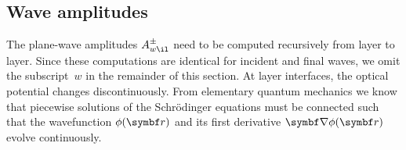 \subsection{Wave amplitudes}\label{Sacrolay}

%
%
%

The plane-wave amplitudes $A^\pm_{w\il}$ need to be computed recursively
from layer to layer.
Since these computations are identical for incident and final waves,
we omit the subscript~$w$ in the remainder of this section.
At layer interfaces, the optical potential changes discontinuously.
From elementary quantum mechanics we know that
piecewise solutions of the Schrödinger equations must be connected
such that the wavefunction $\phi(\r)$ and its first derivative
$\Nabla\phi(\r)$ evolve continuously.


